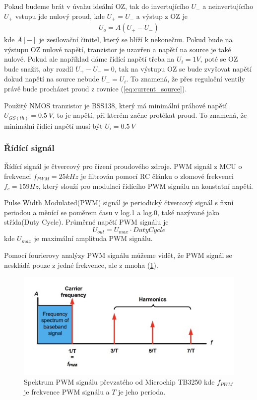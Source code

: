 Pokud budeme brát v úvahu ideální OZ, tak do invertujícího $U_-$ a neinvertujícího $U_+$ vstupu jde nulový proud, kde $U_+ = U_-$ a výstup z OZ je
\begin{align}
    U_o = A(U_+ - U_-)
\end{align}
kde $A [-] $ je zesilovační činitel, který se blíží k nekonečnu. Pokud bude na výstupu OZ nulové napětí, tranzistor je uzavřen a napětí na source je také nulové. Pokud ale například dáme řídící napětí třeba na $U_i = 1V$, poté se OZ bude snažit, aby rozdíl $U_+ - U_- = 0$, tak na výstupu OZ se bude zvyšovat napětí dokud napětí na source nebude $U_- = U_i$. To znamená, že přes regulační ventily právě bude procházet proud z rovnice (\ref{eq:current_source}).

Použitý NMOS tranzistor je BSS138, který má minimální práhové napětí $U_{GS(th)} = 0.5 \ V$, to je napětí, při kterém začne protékat proud. To znamená, že minimální řídící napětí musí být $U_{i} = 0.5 \ V$


\subsubsection{Řídící signál}
Řídící signál je čtvercový pro řízení proudového zdroje. PWM signál z MCU o frekvenci $f_{PWM} = 25 kHz$ je filtrován pomocí RC článku o zlomové frekvenci $f_c = 159 Hz$, který slouží pro modulaci řídícího PWM signálu na konstatní napětí.
\par
Pulse Width Modulated(PWM) signál je periodický čtvercový signál s fixní periodou a měnící se poměrem času v log.1 a log.0, také nazývané jako střída(Duty Cycle). Průměrné napětí PWM signálu je
\begin{equation}
    U_{out} = U_{max} \cdot Duty Cycle
\end{equation}
kde $U_{max}$ je maximální amplituda PWM signálu. \par


Pomocí fourierovy analýzy PWM signálu můžeme vidět, že PWM signál se neskládá pouze z jedné frekvence, ale z mnoha (\ref{fig:pwm_spectrum}).

\begin{figure}[H]
    \centering
    \includegraphics[width=1\linewidth]{pictures/pwm_spectrum_microchip90003250A.jpg}
    \caption{Spektrum PWM signálu převzatého od Microchip TB3250 kde $f_{PWM}$ je frekvence PWM signálu a $T$ je jeho perioda.}
    \label{fig:pwm_spectrum}
\end{figure}

